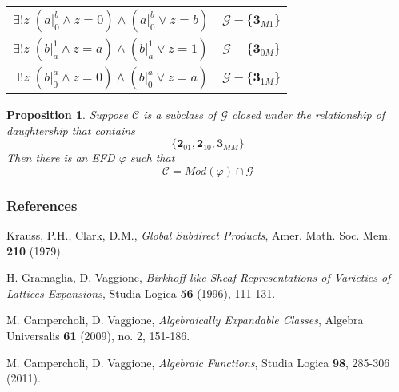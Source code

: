\documentclass[12pt,handout]{beamer}
\newtheorem{propo}{Proposition}
\begin{document}
\begin{frame}
\begin{tabular}{ | l | l | }
\pause

$\exists ! z \; ( a|_0^b \wedge z = 0 ) 

\wedge  (a|_0^b \vee z = b)$ & \pause $\mathcal{G} - \{\mathbf3_{M1}\}$ %
\\

\pause

$\exists ! z \; ( b|_a^1 \wedge z = a ) 

\wedge  (b|_a^1 \vee z = 1)$ & \pause $\mathcal{G} - \{\mathbf3_{0M}\}$ %
\\

\pause

$\exists ! z \; ( b|_0^a \wedge z = 0 ) 

\wedge  (b|_0^a \vee z = a)$ & \pause $\mathcal{G} - \{\mathbf3_{1M}\}$ %
\\

\hline
\end{tabular}

\bigskip

\end{frame}

\begin{frame}
 
\begin{propo}
 
Suppose $\mathcal{C}$ is a subclass of $\mathcal{G}$ closed under the relationship of daughtership that contains 
\[ \{\mathbf{2}_{01}, \mathbf{2}_{10}, \mathbf{3}_{MM} \} \]
Then there is an EFD $\varphi$ such that 
\[ \mathcal{C} = Mod(\varphi) \cap \mathcal{G} \]
\end{propo}

\end{frame}


\begin{frame}%
\frametitle{References}

\begin{thebibliography}{CamVag2009}

{}\textrm{Krauss, P.H., Clark, D.M.}, 
\textit{Global Subdirect Products}, Amer. Math. Soc. Mem. \textbf{210} (1979).

{}\textrm{H. Gramaglia, D. Vaggione}, 
\textit{Birkhoff-like Sheaf Representations of Varieties of Lattices Expansions}, Studia Logica \textbf{56} (1996), 111-131.

{}\textrm{M. Campercholi, D. Vaggione}, \textit{Algebraically Expandable
Classes}, Algebra Universalis \textbf{61} (2009), no. 2, 151-186.

{}\textrm{M. Campercholi, D. Vaggione}, \textit{Algebraic Functions}, Studia Logica \textbf{98}, 285-306 (2011).



\end{thebibliography}

\end{frame}

\begin{frame}
\begin{figure}[center]
\end{figure}
\end{frame}
\end{document}
